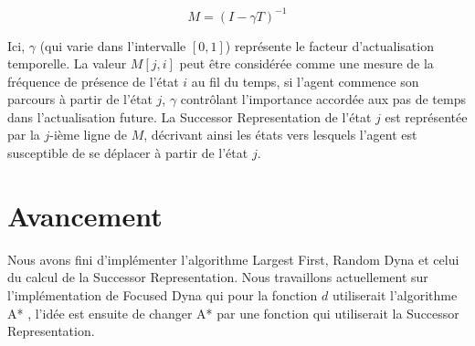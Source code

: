 \documentclass{article}
\begin{document}
\[ M = (I - \gamma T)^{-1} \]

Ici, \( \gamma \) (qui varie dans l'intervalle \([0,1]\)) représente le facteur d'actualisation temporelle. La valeur \( M[j,i] \) peut être considérée comme une mesure de la fréquence de présence de l'état \( i \) au fil du temps, si l'agent commence son parcours à partir de l'état \( j \), \( \gamma \) contrôlant l'importance accordée aux pas de temps dans l'actualisation future. La Successor Representation de l'état \( j \) est représentée par la \( j \)-ième ligne de \( M \), décrivant ainsi les états vers lesquels l'agent est susceptible de se déplacer à partir de l'état \( j \).


\section{Avancement}

Nous avons fini d’implémenter l’algorithme Largest First, Random Dyna et celui du calcul de la Successor Representation. Nous travaillons actuellement sur l’implémentation de Focused Dyna qui pour la fonction $d$ utiliserait l’algorithme A* , l’idée est ensuite de changer A* par une fonction qui utiliserait la Successor Representation. 
\end{document}
